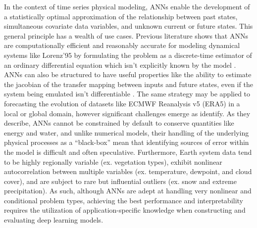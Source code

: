In the context of time series physical modeling, ANNs enable the development of a statistically optimal approximation of the relationship between past states, simultaneous covariate data variables, and unknown current or future states. This general principle has a wealth of use cases. Previous literature shows that ANNs are computationally efficient and reasonably accurate for modeling dynamical systems like Lorenz'95 by formulating the problem as a discrete-time estimator of an ordinary differential equation which isn't explicitly known by the model \citep{fablet_bilinear_2018}. ANNs can also be structured to have useful properties like the ability to estimate the jacobian of the transfer mapping between inputs and future states, even if the system being emulated isn't differentiable \citep{nonnenmacher_deep_2021}. The same strategy may be applied to forecasting the evolution of datasets like ECMWF Reanalysis v5 (ERA5) in a local or global domain, however significant challenges emerge as \citep{dueben_challenges_2018} identify. As they describe, ANNs cannot be constrained by default to conserve quantities like energy and water, and unlike numerical models, their handling of the underlying physical processes as a ``black-box'' mean that identifying sources of error within the model is difficult and often speculative. Furthermore, Earth system data tend to be highly regionally variable (ex. vegetation types), exhibit nonlinear autocorrelation between multiple variables (ex. temperature, dewpoint, and cloud cover), and are subject to rare but influential outliers (ex. snow and extreme precipitation). As such, although ANNs are adept at handling very nonlinear and conditional problem types, achieving the best performance and interpretability requires the utilization of application-specific knowledge when constructing and evaluating deep learning models.

